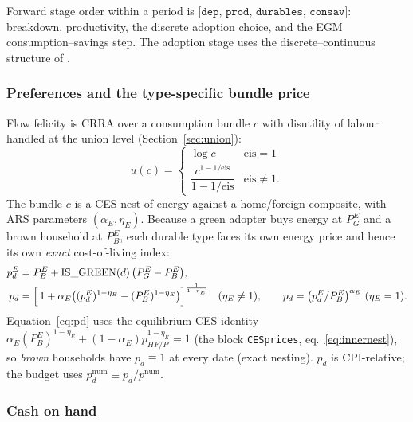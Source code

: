 \documentclass[11pt,a4paper]{article}
\newcommand{\num}{\mathrm{num}}
\newcommand{\PEB}{P^{E}_{B}}
\newcommand{\PEG}{P^{E}_{G}}
\newcommand{\pE}{p^{E}}
\begin{document}
Forward stage order within a period is
$\texttt{[dep, prod, durables, consav]}$: breakdown, productivity, the discrete
adoption choice, and the EGM consumption--savings step. The adoption stage uses
the discrete--continuous structure of \cite{DCEGM2017}.

\subsubsection{Preferences and the type-specific bundle price}

Flow felicity is CRRA over a consumption bundle $c$ with disutility of labour
handled at the union level (Section~\ref{sec:union}):
\begin{equation}
u(c)=\begin{cases}\log c & \text{eis}=1\\[2pt]
\dfrac{c^{1-1/\text{eis}}}{1-1/\text{eis}} & \text{eis}\neq 1.\end{cases}
\end{equation}
The bundle $c$ is a CES nest of energy against a home/foreign composite, with
ARS parameters $(\alpha_E,\eta_E)$. Because a green adopter buys energy at $\PEG$
and a brown household at $\PEB$, each durable type faces its own energy price and
hence its own \emph{exact} cost-of-living index:
\begin{align}
\pE_d &= \PEB + \mathrm{IS\_GREEN}(d)\,\bigl(\PEG-\PEB\bigr),\\
p_d &= \Bigl[\,1+\alpha_E\bigl((\pE_d)^{1-\eta_E}-(\PEB)^{1-\eta_E}\bigr)\Bigr]^{\frac{1}{1-\eta_E}}
\quad(\eta_E\neq 1),\qquad
p_d=\bigl(\pE_d/\PEB\bigr)^{\alpha_E}\ (\eta_E=1).
\label{eq:pd}
\end{align}
Equation~\eqref{eq:pd} uses the equilibrium CES identity
$\alpha_E(\PEB)^{1-\eta_E}+(1-\alpha_E)p_{HF/P}^{1-\eta_E}=1$
(the block \texttt{CESprices}, eq.~\eqref{eq:innernest}), so \emph{brown}
households have $p_d\equiv 1$ at every date (exact nesting). $p_d$ is
CPI-relative; the budget uses $p_d^{\num}\equiv p_d/p^{\num}$.

\subsubsection{Cash on hand}\label{sec:coh}
\end{document}

